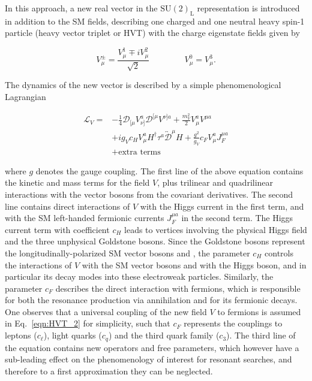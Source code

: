 In this approach, a new real vector in the $\mathrm{SU(2)_L}$ representation is introduced in addition to the SM fields, describing one charged and one neutral heavy spin-1 particle (heavy vector triplet or HVT) with the charge eigenstate fields given by

\begin{equation}\label{eqn:HVT_1}
V^\pm_\mu = \frac{V^1_\mu \mp iV^2_\mu}{\sqrt{2}} \, \qquad\qquad V^0_\mu = V^3_\mu.
\end{equation}

The dynamics of the new vector is described by a simple phenomenological Lagrangian

\begin{equation}\label{eqn:HVT_2}
\begin{split}
\mathcal{L}_V = & -\frac{1}{4}\mathcal{D}_{[\mu}V^a_{\nu]}\mathcal{D}^{[\mu}V^{\nu]a} + \frac{m^2_V}{2}V^a_\mu V^{\mu a}\\
 & + ig_Vc_HV^a_\mu H^\dag\tau^a\overleftrightarrow{\mathcal{D}}^\mu H + \frac{g^2}{g_V}c_FV^a_\mu J^{\mu a}_F\\
 & + \mbox{extra terms}
 \end{split}
\end{equation}

\noindent where $g$ denotes the gauge coupling.
The first line of the above equation contains the kinetic and mass terms for the field $V$, plus trilinear and quadrilinear interactions with the vector bosons from the covariant derivatives.
The second line contains direct interactions of $V$ with the Higgs current in the first term, and with the SM left-handed fermionic currents $J^{\mu a}_F$ in the second term.
The Higgs current term with coefficient $c_H$ leads to vertices involving the physical Higgs field and the three unphysical Goldstone bosons.
Since the Goldstone bosons represent the longitudinally-polarized SM vector bosons \PW and \PZ, the parameter $c_H$ controls the interactions of $V$ with the SM vector bosons and with the Higgs boson, and in particular its decay modes into these electroweak particles.
Similarly, the parameter $c_F$ describes the direct interaction with fermions, which is responsible for both the resonance production via \qqbar annihilation and for its fermionic decays.
One observes that a universal coupling of the new field $V$ to fermions is assumed in Eq.~\ref{eqn:HVT_2} for simplicity, such that $c_F$ represents the couplings to leptons ($c_\ell$), light quarks ($c_q$) and the third quark family ($c_3$).
The third line of the equation contains new operators and free parameters, which however have a sub-leading effect on the phenomenology of interest for resonant searches, and
therefore to a first approximation they can be neglected.%

